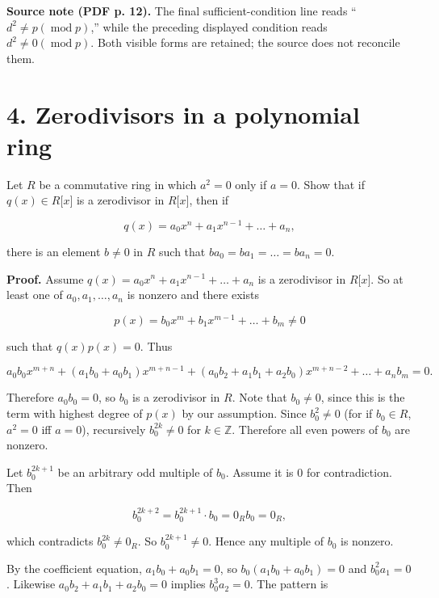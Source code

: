 {\textbf{Source note (PDF p. 12).} The final sufficient-condition line reads ``\(d^{2} \neq p\left( {\operatorname{mod}p} \right)\),'' while the preceding displayed condition reads \(d^{2} \neq 0\left( {\operatorname{mod}p} \right)\). Both visible forms are retained; the source does not reconcile them.}

\section{4. Zerodivisors in a polynomial ring}

Let \(R\) be a commutative ring in which \(a^{2} = 0\) only if \(a = 0\). Show that if \(q(x) \in R\lbrack x\rbrack\) is a zerodivisor in \(R\lbrack x\rbrack\), then if

\[q(x) = a_{0}x^{n} + a_{1}x^{n - 1} + \ldots + a_{n},\]

there is an element \(b \neq 0\) in \(R\) such that \(ba_{0} = ba_{1} = \ldots = ba_{n} = 0\).

\textbf{Proof.} Assume \(q(x) = a_{0}x^{n} + a_{1}x^{n - 1} + \ldots + a_{n}\) is a zerodivisor in \(R\lbrack x\rbrack\). So at least one of \(a_{0},a_{1},\ldots,a_{n}\) is nonzero and there exists

\[p(x) = b_{0}x^{m} + b_{1}x^{m - 1} + \ldots + b_{m} \neq 0\]

such that \(q(x)p(x) = 0\). Thus

\[a_{0}b_{0}x^{m + n} + \left( {a_{1}b_{0} + a_{0}b_{1}} \right)x^{m + n - 1} + \left( {a_{0}b_{2} + a_{1}b_{1} + a_{2}b_{0}} \right)x^{m + n - 2} + \ldots + a_{n}b_{m} = 0.\]

Therefore \(a_{0}b_{0} = 0\), so \(b_{0}\) is a zerodivisor in \(R\). Note that \(b_{0} \neq 0\), since this is the term with highest degree of \(p(x)\) by our assumption. Since \(b_{0}^{2} \neq 0\) (for if \(b_{0} \in R\), \(a^{2} = 0\) iff \(a = 0\)), recursively \(b_{0}^{2k} \neq 0\) for \(k \in \mathbb{Z}\). Therefore all even powers of \(b_{0}\) are nonzero.

Let \(b_{0}^{2k + 1}\) be an arbitrary odd multiple of \(b_{0}\). Assume it is \(0\) for contradiction. Then

\[b_{0}^{2k + 2} = b_{0}^{2k + 1} \cdot b_{0} = 0_{R}b_{0} = 0_{R},\]

which contradicts \(b_{0}^{2k} \neq 0_{R}\). So \(b_{0}^{2k + 1} \neq 0\). Hence any multiple of \(b_{0}\) is nonzero.

By the coefficient equation, \(a_{1}b_{0} + a_{0}b_{1} = 0\), so \(b_{0}\left( {a_{1}b_{0} + a_{0}b_{1}} \right) = 0\) and \(b_{0}^{2}a_{1} = 0\). Likewise \(a_{0}b_{2} + a_{1}b_{1} + a_{2}b_{0} = 0\) implies \(b_{0}^{3}a_{2} = 0\). The pattern is


